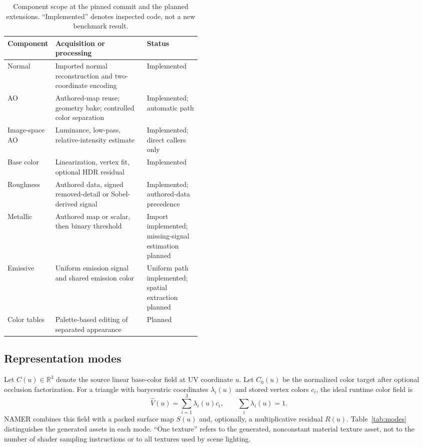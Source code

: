 \documentclass[11pt,letterpaper]{article}
\newcommand{\R}{\mathbb{R}}
\newcommand{\vcol}{\widehat{V}}
\begin{document}
\begin{table}[htbp]
\centering
\caption{Component scope at the pinned commit and the planned extensions. ``Implemented'' denotes inspected code, not a new benchmark result.}
\label{tab:status}
\small
\begin{tabularx}{\linewidth}{@{}>{\raggedright\arraybackslash}p{0.16\linewidth}Y >{\raggedright\arraybackslash}p{0.29\linewidth}@{}}
\toprule
Component & Acquisition or processing & Status \\
\midrule
Normal & Imported normal reconstruction and two-coordinate encoding & Implemented \\
AO & Authored-map reuse; geometry bake; controlled color separation & Implemented; automatic path \\
Image-space AO & Luminance, low-pass, relative-intensity estimate & Implemented; direct callers only \\
Base color & Linearization, vertex fit, optional HDR residual & Implemented \\
Roughness & Authored data, signed removed-detail or Sobel-derived signal & Implemented; authored-data precedence \\
Metallic & Authored map or scalar, then binary threshold & Import implemented; missing-signal estimation planned \\
Emissive & Uniform emission signal and shared emission color & Uniform path implemented; spatial extraction planned \\
Color tables & Palette-based editing of separated appearance & Planned \\
\bottomrule
\end{tabularx}
\end{table}

\subsection{Representation modes}
Let $C(u)\in\R^3$ denote the source linear base-color field at UV coordinate $u$. Let $C_0(u)$ be the normalized color target after optional occlusion factorization. For a triangle with barycentric coordinates $\lambda_i(u)$ and stored vertex colors $c_i$, the ideal runtime color field is
\begin{equation}
\vcol(u)=\sum_{i=1}^{3}\lambda_i(u)c_i,
\qquad \sum_i\lambda_i(u)=1.
\label{eq:vertexfield}
\end{equation}
NAMER combines this field with a packed surface map $S(u)$ and, optionally, a multiplicative residual $R(u)$. Table~\ref{tab:modes} distinguishes the generated assets in each mode. ``One texture'' refers to the generated, nonconstant material texture asset, not to the number of shader sampling instructions or to all textures used by scene lighting.
\end{document}
